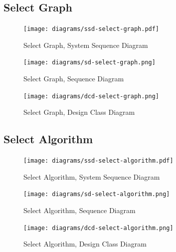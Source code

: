 \subsection{Select Graph}
\begin{figure}[H]
    \texttt{[image: diagrams/ssd-select-graph.pdf]}
    \caption{Select Graph, System Sequence Diagram}
    \label{fig:select-graph-ssd}
\end{figure}
\begin{figure}[H]
    \texttt{[image: diagrams/sd-select-graph.png]}
    \caption{Select Graph, Sequence Diagram}
    \label{fig:select-graph-sd}
\end{figure}
\begin{figure}[H]
    \texttt{[image: diagrams/dcd-select-graph.png]}
    \caption{Select Graph, Design Class Diagram}
    \label{fig:select-graph-dcd}
\end{figure}
\newpage
% 
\subsection{Select Algorithm}
\begin{figure}[H]
    \texttt{[image: diagrams/ssd-select-algorithm.pdf]}
    \caption{Select Algorithm, System Sequence Diagram}
    \label{fig:select-algorithm-ssd}
\end{figure}
\begin{figure}[H]
    \texttt{[image: diagrams/sd-select-algorithm.png]}
    \caption{Select Algorithm, Sequence Diagram}
    \label{fig:select-algorithm-sd}
\end{figure}
\begin{figure}[H]
    \texttt{[image: diagrams/dcd-select-algorithm.png]}
    \caption{Select Algorithm, Design Class Diagram}
    \label{fig:select-algorithm-dcd}
\end{figure}

